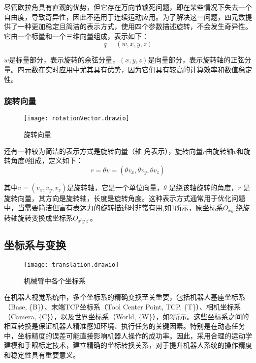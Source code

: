 尽管欧拉角具有直观的优势，但它存在万向节锁死问题，即在某些情况下失去一个自由度，导致奇异性，因此不适用于连续运动应用。为了解决这一问题，四元数提供了一种更加稳定且简洁的表示方式，使用四个参数描述旋转，不会发生奇异性。它由一个标量和一个三维向量组成，表示如下：
\begin{equation}
	\label{equ:Quaternion}
	q=(w,x,y,z)
\end{equation}

$w$是标量部分，表示旋转的余弦分量，$(x,y,z)$是向量部分，表示旋转轴的正弦分量。四元数在实时应用中尤其具有优势，因为它们具有较高的计算效率和数值稳定性。

 \subsubsection{旋转向量}
 
  \begin{figure}[htbp]
 	\texttt{[image: rotationVector.drawio]}
 	\caption[旋转向量]{旋转向量} %
 	\label{fig: rotationVector.drawio}
 \end{figure}
还有一种较为简洁的表示方式是旋转向量（轴-角表示），旋转向量$r$由旋转轴$v$和旋转角度$\theta$组成，定义如下：
\begin{equation}
	\label{equ:rotationVector}
	r=\theta v=(\theta v_{x},\theta v_{y},\theta v_{z})
\end{equation}

其中$v=(v_{x},v_{y},v_{z})$是旋转轴，它是一个单位向量，$\theta$ 是绕该轴旋转的角度，$r$ 是旋转向量，其方向是旋转轴，长度是旋转角度。这种表示方式通常用于优化问题中，当需要简洁但富有表达力的旋转描述时非常有用,如\cref{fig: rotationVector.drawio}所示，原坐标系$O_{xyz}$绕旋转轴旋转变换成坐标系$O_{x^{\prime}y^{\prime}z^{\prime}}$。


\subsection{坐标系与变换}
 \begin{figure}[htb]
	\texttt{[image: translation.drawio]}
	\caption[机械臂中各个坐标系]{机械臂中各个坐标系} %
	\label{fig:translation.drawio}
\end{figure}

在机器人视觉系统中，多个坐标系的精确变换至关重要，包括机器人基座坐标系（Base, \{B\}）、末端TCP坐标系（Tool Center Point, TCP, \{T\}）、相机坐标系（Camera, \{C\}），以及世界坐标系（World, \{W\}），如\cref{fig:translation.drawio}所示。这些坐标系之间的相互转换是保证机器人精准感知环境、执行任务的关键因素。特别是在动态任务中，坐标精度的误差可能直接影响机器人操作的成功率。因此，采用合理的运动学建模和手眼标定技术，建立精确的坐标转换关系，对于提升机器人系统的操作精度和稳定性具有重要意义。

